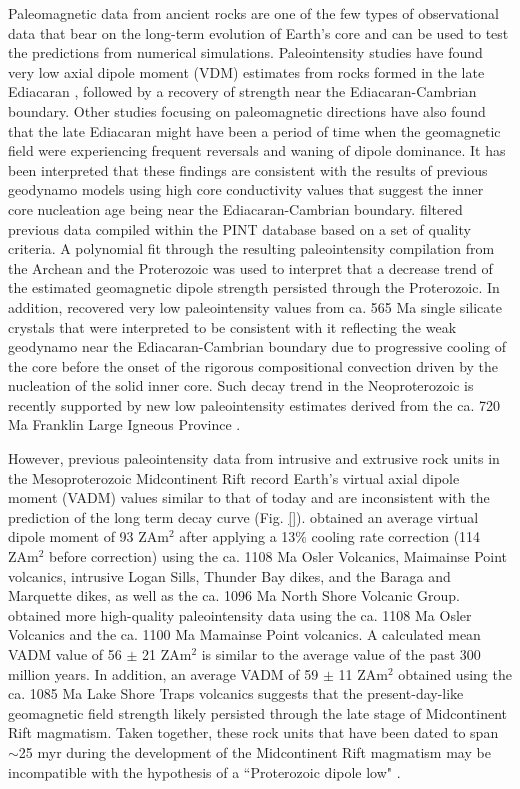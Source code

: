 \documentclass[draft]{agujournal2019}
\begin{document}
Paleomagnetic data from ancient rocks are one of the few types of observational data that bear on the long-term evolution of Earth’s core and can be used to test the predictions from numerical simulations. Paleointensity studies have found very low axial dipole moment (VDM) estimates from rocks formed in the late Ediacaran \cite{Bono2019a, Shcherbakova2019a, Thallner2021b}, followed by a recovery of strength near the  Ediacaran-Cambrian boundary. Other studies focusing on paleomagnetic directions have also found that the late Ediacaran might have been a period of time when the geomagnetic field were experiencing frequent reversals and waning of dipole dominance. It has been interpreted that these findings are consistent with the results of previous geodynamo models using high core conductivity values that suggest the inner core nucleation age being near the Ediacaran-Cambrian boundary.  filtered previous data compiled within the PINT database based on a set of quality criteria. A polynomial fit through the resulting paleointensity compilation from the Archean and the Proterozoic was used to interpret that a decrease trend of the estimated geomagnetic dipole strength persisted through the Proterozoic. In addition,  recovered very low paleointensity values from ca. 565 Ma single silicate crystals that were interpreted to be consistent with it reflecting the weak geodynamo near the Ediacaran-Cambrian boundary due to progressive cooling of the core before the onset of the rigorous compositional convection driven by the nucleation of the solid inner core. Such decay trend in the Neoproterozoic is recently supported by new low paleointensity estimates derived from the ca. 720 Ma Franklin Large Igneous Province \cite{Lloyd2021a}. 

However, previous paleointensity data from intrusive and extrusive rock units in the Mesoproterozoic Midcontinent Rift \cite{Pesonen1983a, Kulakov2013a, Sprain2018a} record Earth's virtual axial dipole moment (VADM) values similar to that of today and are inconsistent with the prediction of the long term decay curve (Fig. \ref{}).  obtained an average virtual dipole moment of 93 ZAm$^2$ after applying a 13\% cooling rate correction (114 ZAm$^2$ before correction) using the ca. 1108 Ma Osler Volcanics, Maimainse Point volcanics, intrusive Logan Sills, Thunder Bay dikes, and the Baraga and Marquette dikes, as well as the ca. 1096 Ma North Shore Volcanic Group.  obtained more high-quality paleointensity data using the ca. 1108 Ma Osler Volcanics and the ca. 1100 Ma Mamainse Point volcanics. A calculated mean VADM value of 56 $\pm$ 21 ZAm$^2$ is similar to the average value of the past 300 million years. In addition, an average VADM of 59 $\pm$ 11 ZAm$^2$ obtained  using the ca. 1085 Ma Lake Shore Traps volcanics suggests that the present-day-like geomagnetic field strength likely persisted through the late stage of Midcontinent Rift magmatism. Taken together, these rock units that have been dated to span $\sim$25 myr during the development of the Midcontinent Rift magmatism \cite{Swanson-Hysell2019a} may be incompatible with the hypothesis of a ``Proterozoic dipole low" \cite{Biggin2009a}. 
\end{document}
